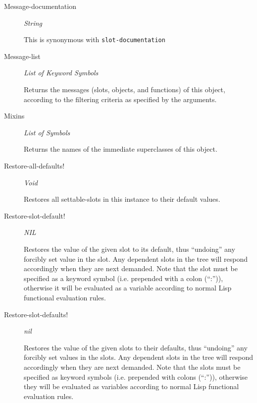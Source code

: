 \documentclass [11pt]{book}
\begin{document}
\begin{itemize}
\begin{description}
\item [Message-documentation]
\emph{String}

 This is synonymous with \texttt{slot-documentation}




\item [Message-list]
\emph{List of Keyword Symbols}

 Returns the messages (slots, objects, and functions) of this object, according to the filtering criteria as specified by the arguments.




\item [Mixins]
\emph{List of Symbols}

 Returns the names of the immediate superclasses of this object.




\item [Restore-all-defaults!]
\emph{Void}

 Restores all settable-slots in this instance to their default values.




\item [Restore-slot-default!]
\emph{NIL}

 Restores the value of the given slot to its default, thus ``undoing'' any forcibly set value
in the slot. Any dependent slots in the tree will respond accordingly when they are next demanded.
Note that the slot must be specified as a keyword symbol (i.e. prepended with a colon (``:'')),
otherwise it will be evaluated as a variable according to normal Lisp functional evaluation rules.




\item [Restore-slot-defaults!]
\emph{nil}

 Restores the value of the given slots to their defaults, thus ``undoing'' any forcibly set values
in the slots. Any dependent slots in the tree will respond accordingly when they are next demanded.
Note that the slots must be specified as keyword symbols (i.e. prepended with colons (``:'')),
otherwise they will be evaluated as variables according to normal Lisp functional evaluation rules.





\end{description}
\end{itemize}
\end{document}
